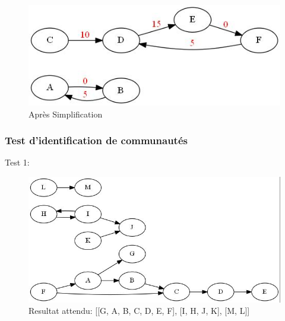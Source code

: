 \documentclass[12pt, oneside]{article}
\begin{document}
\begin{figure}[!h]
    \centering
    \includegraphics[scale=0.7,trim=3 3 3 3,clip]{simplify2after}
    \caption{Après Simplification}
\end{figure}
\newpage
\FloatBarrier
\subsubsection{Test d'identification de communautés}
Test 1:
\begin{figure}[!h]
    \centering
    \includegraphics[scale=0.7,trim=3 3 3 3,clip]{community1}
    \caption{Resultat attendu: [[G, A, B, C, D, E, F], [I, H, J, K], [M, L]]}
\end{figure}
\newpage
\FloatBarrier
\end{document}
